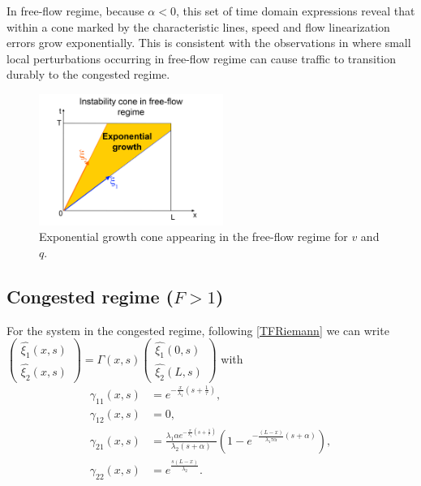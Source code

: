 \documentclass[letterpaper, 10 pt, conference]{ieeeconf}  %
\begin{document}
In free-flow regime, because $\alpha < 0$, this set of time domain expressions reveal that within a cone marked by the characteristic lines, speed and flow linearization errors grow exponentially. This is consistent with the observations in \cite{PhysRevLett.79.4030} where small local perturbations occurring in free-flow regime can cause traffic to transition durably to the congested regime.

\begin{figure}
\begin{centering}
\includegraphics[width=6cm]{Exp-growth}
\par\end{centering}
\protect\caption{Exponential growth cone appearing in the free-flow regime for $v$ and $q$.\label{Exp-growth}}
\end{figure}

\subsection{Congested regime ($F>1$)}
For the system in the congested regime, following \eqref{TFRiemann} we can write
{\footnotesize
$\label{vqcongested}
\begin{pmatrix}
	\hat{\xi_{1}}(x,s)\\
	\hat{\xi_{2}}(x,s)
\end{pmatrix} = 
\Gamma(x,s)
\begin{pmatrix}
	\hat{\xi_{1}}\left(0,s\right)\\
	\hat{\xi_{2}}\left(L,s\right)
\end{pmatrix}
$
}
with 
\begin{subequations}
\begin{align}
\gamma_{11}\left(x,s\right)&=
e^{-\frac{x}{\lambda_{1}}\left(s+\frac{1}{\tau}\right)} , \\
\gamma_{12}\left(x,s\right)&=0, \\
\gamma_{21}\left(x,s\right)&=
\frac{\lambda_{1} \alpha e^{-\frac{x}{\lambda_{1}} \left( s + \frac{1}{\tau} \right)}}
{\lambda_{2}\left(s + \alpha\right)}
\left(
	1 -
	e^{-\frac{\left(L - x\right)
		}{
		\lambda_{1}\tau\alpha
		}
		\left(s+\alpha\right)
		}
\right)
, \\
\gamma_{22}\left(x,s\right)&=e^{\frac{s\left(L-x\right)}{\lambda_{2}}}.
\end{align}
\end{subequations}
\end{document}
